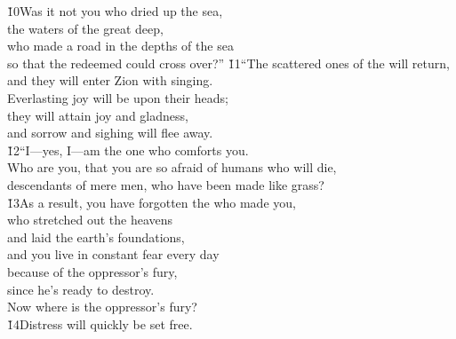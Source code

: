 \begin{poetry}
\poeml \v{10}Was it not you who dried up the sea, \\
\poemll    the waters of the great deep, \\
\poeml who made a road in the depths of the sea \\
\poemll    so that the redeemed could cross over?''
\poeml \v{11}``The scattered ones of the  will return, \\
\poemll    and they will enter Zion with singing. \\
\poeml Everlasting joy will be upon their heads; \\
\poemll    they will attain joy and gladness, \\
\poemlll       and sorrow and sighing will flee away. \\
\poeml \v{12}``I---yes, I---am the one who comforts you. \\
\poemll    Who are you, that you are so afraid of humans who will die, \\
\poemlll       descendants of mere men, who have been made like grass? \\
\poeml \v{13}As a result, you have forgotten the  who made you, \\
\poemll    who stretched out the heavens \\
\poeml and laid the earth's foundations, \\
\poemll    and you live in constant fear every day \\
\poeml because of the oppressor's fury, \\
\poemll    since he's ready to destroy. \\
\poemlll       Now where is the oppressor's fury? \\
\poeml \v{14}Distress will quickly be set free. \\

\end{poetry}
